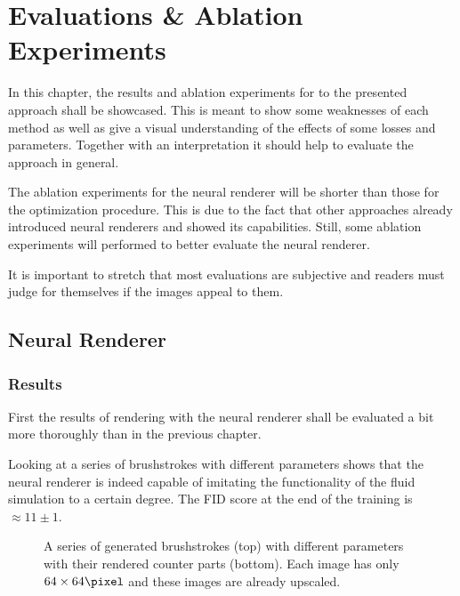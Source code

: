 \setchapterpreamble[u]{\margintoc}
\chapter{Evaluations \& Ablation Experiments}

In this chapter, the results and ablation experiments for to the presented approach shall be showcased.
This is meant to show some weaknesses of each method as well as give a visual understanding of the effects of some losses and parameters.
Together with an interpretation it should help to evaluate the approach in general.

The ablation experiments for the neural renderer will be shorter than those for the optimization procedure.
This is due to the fact that other approaches already introduced neural renderers and showed its capabilities.
Still, some ablation experiments will performed to better evaluate the neural renderer.

It is important to stretch that most evaluations are subjective and readers must judge for themselves if the images appeal to them.

\section{Neural Renderer}
\subsection{Results}
First the results of rendering with the neural renderer shall be evaluated a bit more thoroughly than in the previous chapter.

Looking at a series of brushstrokes with different parameters shows that the neural renderer is indeed capable of imitating the functionality of the fluid simulation to a certain degree.
The FID score at the end of the training is $\approx 11 \pm 1$.
\begin{figure}
    \caption{A series of generated brushstrokes (top) with different parameters with their rendered counter parts (bottom). Each image has only $64\times64\si{\pixel}$ and these images are already upscaled.}
\end{figure}

